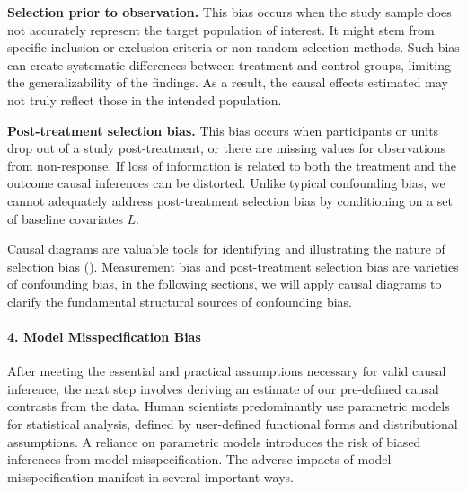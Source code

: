 \documentclass[
  singlecolumn,
  9pt]{article}
\let\oldparagraph\paragraph
\renewcommand{\paragraph}[1]{\oldparagraph{#1}\mbox{}}
\begin{document}
\textbf{Selection prior to observation.} This bias occurs when the study
sample does not accurately represent the target population of interest.
It might stem from specific inclusion or exclusion criteria or
non-random selection methods. Such bias can create systematic
differences between treatment and control groups, limiting the
generalizability of the findings. As a result, the causal effects
estimated may not truly reflect those in the intended population.

\textbf{Post-treatment selection bias.} This bias occurs when
participants or units drop out of a study post-treatment, or there are
missing values for observations from non-response. If loss of
information is related to both the treatment and the outcome causal
inferences can be distorted. Unlike typical confounding bias, we cannot
adequately address post-treatment selection bias by conditioning on a
set of baseline covariates \(L\).

Causal diagrams are valuable tools for identifying and illustrating the
nature of selection bias ().
Measurement bias and post-treatment selection bias are varieties of
confounding bias, in the following sections, we will apply causal
diagrams to clarify the fundamental structural sources of confounding
bias.

\paragraph{4. Model Misspecification
Bias}\label{model-misspecification-bias}

After meeting the essential and practical assumptions necessary for
valid causal inference, the next step involves deriving an estimate of
our pre-defined causal contrasts from the data. Human scientists
predominantly use parametric models for statistical analysis, defined by
user-defined functional forms and distributional assumptions. A reliance
on parametric models introduces the risk of biased inferences from model
misspecification. The adverse impacts of model misspecification manifest
in several important ways.
\end{document}
